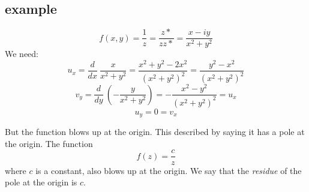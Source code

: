 \documentclass[11pt, oneside]{article}
\begin{document}
\subsection*{example}

\[ f(x,y) = \frac{1}{z} = \frac{z*}{zz*} = \frac{x-iy}{x^2 + y^2} \]
We need:
\[ u_x = \frac{d}{dx} \ \frac{x}{x^2 + y^2} = \frac{x^2 + y^2 - 2x^2}{(x^2 + y^2)^2}  = \frac{y^2 - x^2}{(x^2 + y^2)^2} \]
\[ v_y = \frac{d}{dy} \ (-\frac{y}{x^2 + y^2} ) = - \frac{x^2 - y^2}{(x^2 + y^2)^2} = u_x \]
\[ u_y =  0 = v_x \]

But the function blows up at the origin.  This described by saying it has a pole at the origin.
The function
\[ f(z) = \frac{c}{z} \]
where $c$ is a constant, also blows up at the origin.  We say that the \emph{residue} of the pole at the origin is $c$.
\end{document}
